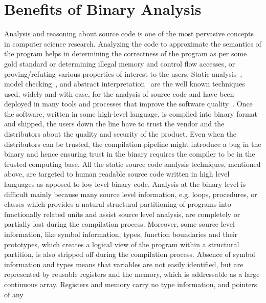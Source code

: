 \section{Benefits of Binary Analysis}
Analysis and reasoning about source code is one of the most pervasive concepts
in computer science research. Analyzing the code to approximate  the semantics
of the program helps in determining the correctness of the program as per some
gold standard or determining illegal memory and control flow accesses, or
proving/refuting various properties of interest to the users. Static
analysis~\cite{Nielson2010}, model checking~\cite{Clarke1981,Queille1982}, and
abstract interpretation~\cite{Cousot1977} are the well known techniques used,
         widely and with ease, for the  analysis of source code and have been
         deployed in many tools and processes that improve the software
         quality~\cite{Xie:2003,Musuvathi:2008,Ivancic:2005,Dwyer:2007,Binkley:2007,Bessey2010,Ball2006}.
         Once the software, written in some high-level language, is compiled
         into binary format and shipped, the users down the line have to trust
         the vendor and the distributors about the quality and security of the
         product. Even when the distributors can be trusted, the compilation
         pipeline might introduce a bug in the binary and hence ensuring trust
         in the binary requires the compiler to be in the trusted computing
         base.  All the static source code analysis techniques, mentioned
         above, are targeted to human readable source code written in high
         level languages as apposed to low level binary code. Analysis at the
         binary level is difficult mainly because many source level
         information, e.g. loops, procedures, or classes which provides a
         natural structural partitioning of programs into functionally related
         units and assist source level analysis, are completely or partially
         lost during the compilation process. Moreover, some source level
         information, like symbol information, types, function boundaries and
         their prototypes, which creates a logical view of the program  within
         a structural partition, is also stripped off during the compilation
         process. Absence of symbol information and types means that variables
         are not easily identified, but are represented by reusable registers
         and the memory, which is addressable as a large continuous array.
         Registers and memory carry no type information, and pointers of any
